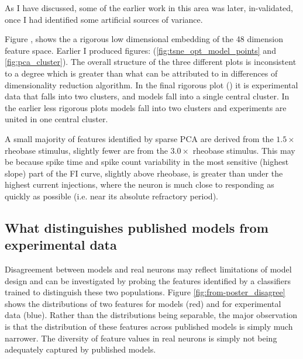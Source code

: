 As I have discussed, some of the earlier work in this area was later, in-validated, once I had identified some artificial sources of variance.

Figure \label{fig:pca_data_points}, shows the a rigorous low dimensional embedding of the 48 dimension feature space. Earlier I produced figures: (\ref{fig:tsne_opt_model_points} and \ref{fig:pca_cluster}). The overall structure of the three different plots is inconsistent to a degree which is greater than what can be attributed to in differences of dimensionality reduction algorithm. In the final rigorous plot (\label{fig:pca_data_points}) it is experimental data that falls into two clusters, and models fall into a single central cluster. In the earlier less rigorous plots models fall into two clusters and experiments are united in one central cluster.





A small majority of features identified by sparse PCA are derived from the $1.5 \times$ rheobase stimulus, slightly fewer are from the $3.0\times$ rheobase stimulus.
This may be because spike time and spike count variability in the most sensitive (highest slope) part of the FI curve, slightly above rheobase, is greater than under the highest current injections, where the neuron is much close to responding as quickly as possible (i.e. near its absolute refractory period).

\subsection{What distinguishes published models from experimental data}
Disagreement between models and real neurons may reflect limitations of model design and can be investigated by probing the features identified by a classifiers trained to distinguish these two populations. 
Figure \ref{fig:from-poster_disagree} shows the distributions of two features for models (red) and for experimental data (blue).
Rather than the distributions being separable, the major observation is that the distribution of these features across published models is simply much narrower.
The diversity of feature values in real neurons is simply not being adequately captured by published models.

